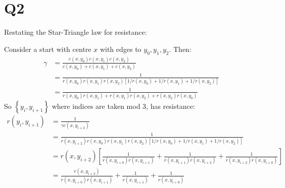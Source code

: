 \documentclass[a4paper, 11pt]{article}
\def\set#1{\left\{ #1 \right\}}
\begin{document}
\section*{Q2}
Restating the Star-Triangle law for resistance:
\begin{mdframed}
	Consider a start with centre $x$ with edges to $y_0,y_1,y_2$. Then:
	\begin{align*}
		\gamma
		 & = \frac{c(x,y_0)c(x,y_1)c(x,y_2)}{c(x,y_0)+c(x,y_1)+c(x,y_2)}                       \\
		 & = \frac{1}{r(x,y_0)r(x,y_1)r(x,y_2)\left[ 1/r(x,y_0)+1/r(x,y_1)+1/r(x,y_2) \right]} \\
		 & = \frac1{r(x,y_0)r(x,y_1) + r(x,y_1)r(x,y_2) + r(x,y_2)r(x,y_0)}
	\end{align*}
	So $\set{y_i,y_{i+1}}$ where indices are taken mod $3$, has resistance:
	\begin{align*}
		r(y_i,y_{i+1}) & = \frac1{\gamma c(x,y_{i+2})}                                                                                                        \\
		               & = \frac{1}{r(x,y_{i+2})r(x,y_0)r(x,y_1)r(x,y_2)\left[ 1/r(x,y_0)+1/r(x,y_1)+1/r(x,y_2) \right]}                                      \\
		               & = r(x,y_{i+2}) \left[ \frac1{r(x,y_{i+0})r(x,y_{i+1})} + \frac1{r(x,y_{i+1})r(x,y_{i+2})} + \frac1{r(x,y_{i+2})r(x,y_{i+0})} \right] \\
		               & =  \frac{r(x,y_{i+2})}{r(x,y_{i+0})r(x,y_{i+1})} + \frac1{r(x,y_{i+1})} + \frac1{r(x,y_{i+0})}
	\end{align*}


\end{mdframed}
\end{document}
